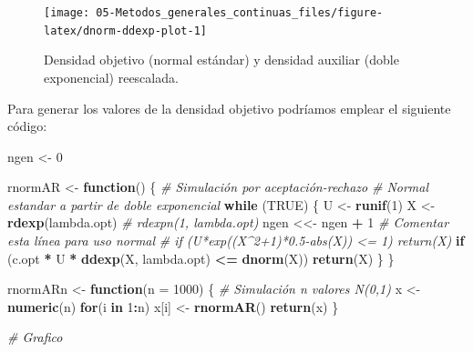 \documentclass[
]{book}
\newenvironment{Shaded}{\begin{snugshade}}{\end{snugshade}}
\newcommand{\CommentTok}[1]{\textcolor[rgb]{0.56,0.35,0.01}{\textit{#1}}}
\newcommand{\ControlFlowTok}[1]{\textcolor[rgb]{0.13,0.29,0.53}{\textbf{#1}}}
\newcommand{\DataTypeTok}[1]{\textcolor[rgb]{0.13,0.29,0.53}{#1}}
\newcommand{\DecValTok}[1]{\textcolor[rgb]{0.00,0.00,0.81}{#1}}
\newcommand{\KeywordTok}[1]{\textcolor[rgb]{0.13,0.29,0.53}{\textbf{#1}}}
\newcommand{\NormalTok}[1]{#1}
\newcommand{\OperatorTok}[1]{\textcolor[rgb]{0.81,0.36,0.00}{\textbf{#1}}}
\newcommand{\OtherTok}[1]{\textcolor[rgb]{0.56,0.35,0.01}{#1}}
\newcommand{\StringTok}[1]{\textcolor[rgb]{0.31,0.60,0.02}{#1}}
\theoremstyle{break}
\theoremstyle{definition}
\theoremstyle{definition}
\theoremstyle{definition}
\theoremstyle{remark}
\begin{document}
\begin{figure}[!htb]

{\centering \texttt{[image: 05-Metodos\_generales\_continuas\_files/figure-latex/dnorm-ddexp-plot-1]} 

}

\caption{Densidad objetivo (normal estándar) y densidad auxiliar (doble exponencial) reescalada.}\label{fig:dnorm-ddexp-plot}
\end{figure}

Para generar los valores de la densidad objetivo podríamos emplear el siguiente código:

\begin{Shaded}
\begin{Highlighting}[]
\NormalTok{ngen <-}\StringTok{ }\DecValTok{0}

\NormalTok{rnormAR <-}\StringTok{ }\ControlFlowTok{function}\NormalTok{() \{}
\CommentTok{# Simulación por aceptación-rechazo}
\CommentTok{# Normal estandar a partir de doble exponencial}
  \ControlFlowTok{while}\NormalTok{ (}\OtherTok{TRUE}\NormalTok{) \{}
\NormalTok{    U <-}\StringTok{ }\KeywordTok{runif}\NormalTok{(}\DecValTok{1}\NormalTok{)}
\NormalTok{    X <-}\StringTok{ }\KeywordTok{rdexp}\NormalTok{(lambda.opt) }\CommentTok{# rdexpn(1, lambda.opt)}
\NormalTok{    ngen <<-}\StringTok{ }\NormalTok{ngen }\OperatorTok{+}\StringTok{ }\DecValTok{1} \CommentTok{# Comentar esta línea para uso normal}
    \CommentTok{# if (U*exp((X^2+1)*0.5-abs(X)) <= 1) return(X)}
    \ControlFlowTok{if}\NormalTok{ (c.opt }\OperatorTok{*}\StringTok{ }\NormalTok{U }\OperatorTok{*}\StringTok{ }\KeywordTok{ddexp}\NormalTok{(X, lambda.opt) }\OperatorTok{<=}\StringTok{ }\KeywordTok{dnorm}\NormalTok{(X)) }\KeywordTok{return}\NormalTok{(X)}
\NormalTok{  \}}
\NormalTok{\}}

\NormalTok{rnormARn <-}\StringTok{ }\ControlFlowTok{function}\NormalTok{(}\DataTypeTok{n =} \DecValTok{1000}\NormalTok{) \{}
\CommentTok{# Simulación n valores N(0,1)}
\NormalTok{    x <-}\StringTok{ }\KeywordTok{numeric}\NormalTok{(n)}
    \ControlFlowTok{for}\NormalTok{(i }\ControlFlowTok{in} \DecValTok{1}\OperatorTok{:}\NormalTok{n) x[i] <-}\StringTok{ }\KeywordTok{rnormAR}\NormalTok{()}
    \KeywordTok{return}\NormalTok{(x)}
\NormalTok{\}}

\CommentTok{# Grafico}
\end{Highlighting}
\end{Shaded}
\end{document}
